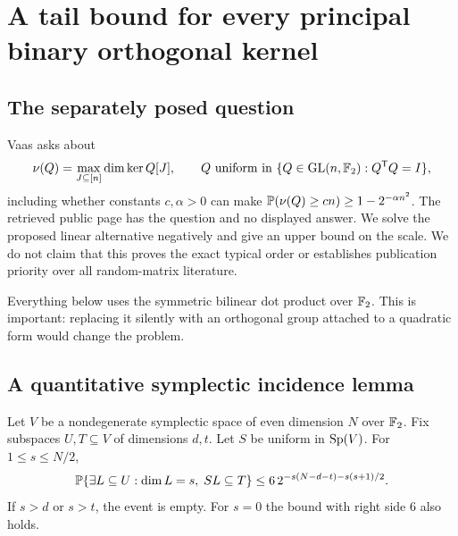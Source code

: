 \section{A tail bound for every principal binary orthogonal kernel}
\label{sec:binary}

\subsection{The separately posed question}

Vaas asks about
\[
 \nu(Q)=\max_{J\subseteq[n]}\dim\ker Q[J],\qquad
 Q\text{ uniform in }\{Q\in\operatorname{GL}(n,\mathbb F_2):Q^{\mathsf T}Q=I\},
\]
including whether constants $c,\alpha>0$ can make
$\mathbb P(\nu(Q)\ge cn)\ge1-2^{-\alpha n^2}$. The retrieved public page has the question and no displayed answer. We solve the proposed linear alternative negatively and give an upper bound on the scale. We do not claim that this proves the exact typical order or establishes publication priority over all random-matrix literature.\cite{vaas}

Everything below uses the symmetric bilinear dot product over $\mathbb F_2$. This is important: replacing it silently with an orthogonal group attached to a quadratic form would change the problem.

\subsection{A quantitative symplectic incidence lemma}

\begin{lemma}\label{lem:symp-incidence}
Let $V$ be a nondegenerate symplectic space of even dimension $N$ over $\mathbb F_2$. Fix subspaces $U,T\subseteq V$ of dimensions $d,t$. Let $S$ be uniform in $\operatorname{Sp}(V)$. For $1\le s\le N/2$,
\[
 \mathbb P\{\exists L\subseteq U:\dim L=s,\;S L\subseteq T\}
 \le 6\,2^{-s(N-d-t)-s(s+1)/2}.
\]
If $s>d$ or $s>t$, the event is empty. For $s=0$ the bound with right side $6$ also holds.
\end{lemma}

